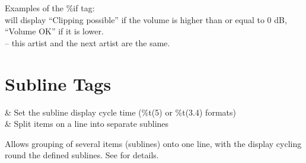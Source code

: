Examples of the \%if tag:\\

 will display ``Clipping
  possible'' if the volume is higher than or equal to 0 dB, ``Volume OK'' if it
  is lower.\\

 -- this artist and the next artist
  are the same.\\


\section{Subline Tags}

\begin{tagmap}
    & Set the subline display cycle time (\%t(5) or \%t(3.4) formats) \\
\config{;}
    & Split items on a line into separate sublines \\
\end{tagmap}

Allows grouping of several items (sublines) onto one line, with the
display cycling round the defined sublines. See
 for details. 

